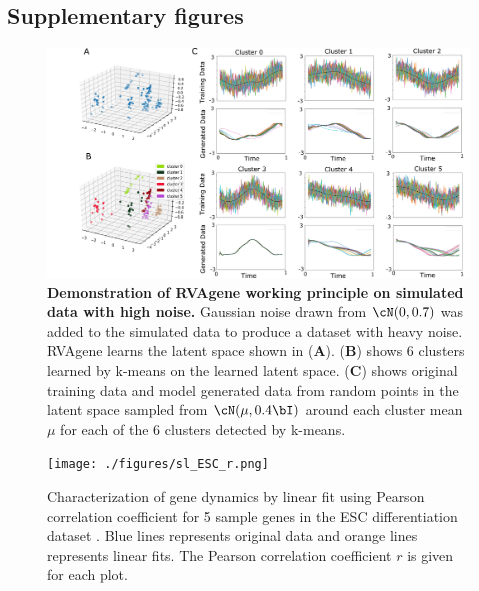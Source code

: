 \subsection*{Supplementary figures}
\label{supp}

\renewcommand{\thefigure}{S\arabic{figure}}
\setcounter{figure}{0}
\begin{center}
\begin{figure}[H]
  \includegraphics[width=\linewidth]{./figures/noisy_sim.png}
    \caption[Demonstration of RVAgene working principle on simulated data with high noise.]{\textbf{Demonstration of RVAgene working principle on simulated data with high noise.} Gaussian noise drawn from $\cN(0,0.7)$ was added to the simulated data to produce a dataset with heavy noise. RVAgene learns the latent space shown in ({\bf A}). ({\bf B}) shows 6 clusters learned by k-means on the learned latent space. ({\bf C}) shows original training data and model generated data from random points in the latent space sampled from $\cN(\mu,0.4\bI)$ around each cluster mean $\mu$ for each of the 6 clusters detected by k-means.}
  \label{fig:figS1}
\end{figure}
\end{center}
\newpage

\begin{center}
\begin{figure}[H]
  \texttt{[image: ./figures/sl\_ESC\_r.png]}
    \caption[Characterization of gene dynamics by linear fit using Pearson correlation coefficient for 5 sample genes in the ESC differentiation dataset]{Characterization of gene dynamics by linear fit using Pearson correlation coefficient for 5 sample genes in the ESC differentiation dataset  \citep{Klein2015}. Blue lines represents original data and orange lines represents linear fits. The Pearson correlation coefficient $r$ is given for each plot.}
  \label{fig:figS2}
\end{figure}
\end{center}
\newpage

